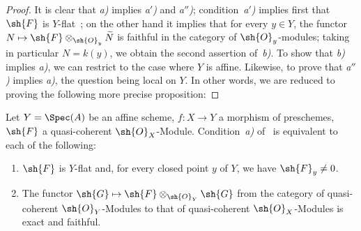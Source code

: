 \begin{proof}
It is clear that \emph{a)} implies \emph{a$'$)} and \emph{a$''$)}; condition~\emph{a$'$)} implies first that $\sh{F}$ is $Y$-flat~; on the other hand it implies that for every $y\in Y$, the functor $N\mapsto\sh{F}\otimes_{\sh{O}_y}\widetilde{N}$ is faithful in the category of $\sh{O}_y$-modules; taking in particular $N=k(y)$, we obtain the second assertion of~\emph{b)}.
To show that \emph{b)} implies \emph{a)}, we can restrict to the case where $Y$ is affine.
Likewise, to prove that \emph{a$''$)} implies \emph{a)}, the question being local on $Y$.
In other words, we are reduced to proving the following more precise proposition:
\end{proof}

\begin{proposition}[2.2.2]
\label{IV.2.2.2}
Let $Y=\Spec(A)$ be an affine scheme, $f:X\to Y$ a morphism of preschemes, $\sh{F}$ a quasi-coherent $\sh{O}_X$-Module.
Condition~\emph{a)} of~ is equivalent to each of the following:
\begin{enumerate}
  \item[\emph{b$'$)}] $\sh{F}$ is $Y$-flat and, for every closed point $y$ of $Y$, we have $\sh{F}_y\neq 0$.
  \item[\emph{c)}] The functor $\sh{G}\mapsto\sh{F}\otimes_{\sh{O}_Y}\sh{G}$ from the category of quasi-coherent $\sh{O}_Y$-Modules to that of quasi-coherent $\sh{O}_X$-Modules is exact and faithful.
\end{enumerate}
\end{proposition}

